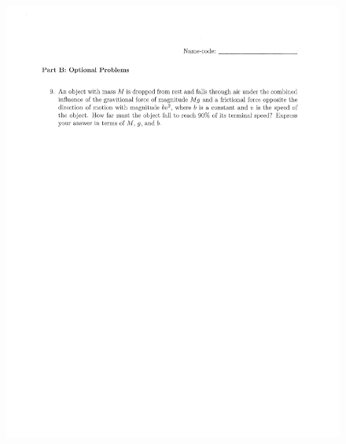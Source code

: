 \documentclass[10pt,a4paper]{article}
\begin{document}
\begin{figure}[H]
 \centering
 \includegraphics[width=16cm]{pdf/1-1T57.png}
\end{figure}
 \newpage
\end{document}
